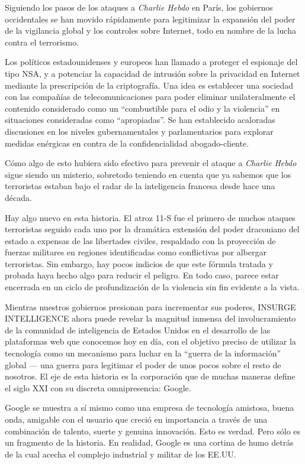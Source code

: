 \documentclass[10pt,a5paper,twoside,spanish,]{book}
\begin{document}
Siguiendo los pasos de los ataques a \emph{Charlie Hebdo} en París, los
gobiernos occidentales se han movido rápidamente para legitimizar la
expansión del poder de la vigilancia global y los controles sobre
Internet, todo en nombre de la lucha contra el terrorismo.

Los políticos estadounidenses y europeos han llamado a proteger el
espionaje del tipo NSA, y a potenciar la capacidad de intrusión sobre la
privacidad en Internet mediante la prescripción de la criptografía. Una
idea es establecer una sociedad con las compañías de telecomunicaciones
para poder eliminar unilateralmente el contenido considerado como un
``combustible para el odio y la violencia'' en situaciones consideradas
como ``apropiadas''. Se han establecido acaloradas discusiones en los
niveles gubernamentales y parlamentarios para explorar medidas enérgicas
en contra de la confidencialidad abogado-cliente.

Cómo algo de esto hubiera sido efectivo para prevenir el ataque a
\emph{Charlie Hebdo} sigue siendo un misterio, sobretodo teniendo en
cuenta que ya sabemos que los terroristas estaban bajo el radar de la
inteligencia francesa desde hace una década.

Hay algo nuevo en esta historia. El atroz 11-S fue el primero de muchos
ataques terroristas seguido cada uno por la dramática extensión del
poder draconiano del estado a expensas de las libertades civiles,
respaldado con la proyección de fuerzas militares en regiones
identificadas como conflictivas por albergar terroristas. Sin embargo,
hay pocos indicios de que este fórmula tratada y probada haya hecho algo
para reducir el peligro. En todo caso, parece estar encerrada en un
ciclo de profundización de la violencia sin fin evidente a la vista.

Mientras nuestros gobiernos presionan para incrementar sus poderes,
INSURGE INTELLIGENCE ahora puede revelar la magnitud inmensa del
involucramiento de la comunidad de inteligencia de Estados Unidos en el
desarrollo de las plataformas web que conocemos hoy en día, con el
objetivo preciso de utilizar la tecnología como un mecanismo para luchar
en la ``guerra de la información'' global --- una guerra para legitimar
el poder de unos pocos sobre el resto de nosotros. El eje de esta
historia es la corporación que de muchas maneras define el siglo XXI con
su discreta omnipresencia: Google.

Google se muestra a sí mismo como una empresa de tecnología amistosa,
buena onda, amigable con el usuario que creció en importancia a través
de una combinación de talento, suerte y genuina innovación. Esto es
verdad. Pero sólo es un fragmento de la historia. En realidad, Google es
una cortina de humo detrás de la cual acecha el complejo industrial y
militar de los EE.UU.
\end{document}
